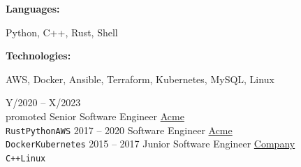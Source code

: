 \documentclass[9pt]{developercv} %
\begin{document}
\begin{minipage}[t]{0.45\textwidth} %

  \vspace{-6pt}

  \lorem \lorem
\end{minipage}
\hfill %
\begin{minipage}[t]{0.50\textwidth} %

  \vspace{-6pt}

    \begin{minipage}[t]{0.3\textwidth}
	  \textbf{Languages:}
    \end{minipage}
    \hfill
    \begin{minipage}[t]{0.6\textwidth}
      Python, C++, Rust, Shell
    \end{minipage}

	\vspace{2mm}

    \begin{minipage}[t]{0.3\textwidth}
	  \textbf{Technologies:}
    \end{minipage}
    \hfill
    \begin{minipage}[t]{0.6\textwidth}
	  AWS, Docker, Ansible, Terraform, Kubernetes, MySQL, Linux
    \end{minipage}
\end{minipage}



\begin{entrylist}
  \entry
  {Y/2020 -- X/2023\\\footnotesize{promoted}}
  {Senior Software Engineer}
  {\href{http://www.acme.com}{Acme}}
  {
  \lorem \lorem
	\bulletsep{}
  \lorem \lorem
	\bulletsep{}
  \lorem \lorem
	\\
	\texttt{Rust}\slashsep\texttt{Python}\slashsep\texttt{AWS}
  }
  \entry
  {2017 -- 2020}
  {Software Engineer}
  {\href{http://www.acme.com}{Acme}}
  {
  \lorem \lorem
	\bulletsep{}
  \lorem \lorem
	\bulletsep{}
  \lorem \lorem
	\\
	\texttt{Docker}\slashsep\texttt{Kubernetes}
  }
  \entry
  {2015 -- 2017}
  {Junior Software Engineer}
  {\href{http://www.company.com}{Company}}
  {
  \lorem \lorem
	\bulletsep{}
  \lorem \lorem
	\\
	\texttt{C++}\slashsep\texttt{Linux}
  }
\end{entrylist}
\end{document}
